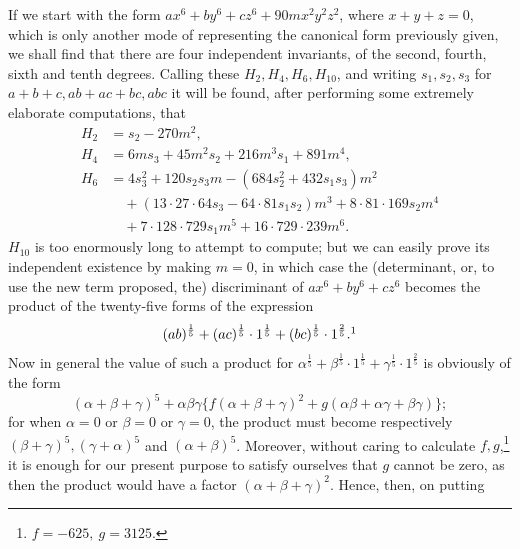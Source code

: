 \documentclass[11pt]{article}
\begin{document}
If we start with the form $ax^6+by^6+cz^6+90mx^2y^2z^2$, where $x+y+z=0$, which is only another mode of representing the canonical form previously given, we shall find that there are four independent invariants, of the second, fourth, sixth and tenth degrees. Calling these $H_2,H_4,H_6,H_{10}$, and writing $s_1,s_2,s_3$ for $a+b+c,ab+ac+bc,abc$ it will be found, after performing some extremely elaborate computations, that
\[
\begin{aligned}
H_2&=s_2-270m^2,\\
H_4&=6ms_3+45m^2s_2+216m^3s_1+891m^4,\\
H_6&=4s_3^2+120s_2s_3m-(684s_2^2+432s_1s_3)m^2\\
&\quad +(13\cdot27\cdot64s_3-64\cdot81s_1s_2)m^3+8\cdot81\cdot169s_2m^4\\
&\quad +7\cdot128\cdot729s_1m^5+16\cdot729\cdot239m^6.
\end{aligned}
\]
$H_{10}$ is too enormously long to attempt to compute; but we can easily prove its independent existence by making $m=0$, in which case the (determinant, or, to use the new term proposed, the) discriminant of $ax^6+by^6+cz^6$ becomes the product of the twenty-five forms of the expression
\[
(ab)^{\frac15}+(ac)^{\frac15}\cdot1^{\frac15}+(bc)^{\frac15}\cdot1^{\frac25}.\footnotemark
\]
Now in general the value of such a product for $\alpha^{\frac15}+\beta^{\frac15}\cdot1^{\frac15}+\gamma^{\frac15}\cdot1^{\frac25}$ is obviously of the form
\[
(\alpha+\beta+\gamma)^5+\alpha\beta\gamma\{f(\alpha+\beta+\gamma)^2+g(\alpha\beta+\alpha\gamma+\beta\gamma)\};
\]
for when $\alpha=0$ or $\beta=0$ or $\gamma=0$, the product must become respectively $(\beta+\gamma)^5,(\gamma+\alpha)^5$ and $(\alpha+\beta)^5$. Moreover, without caring to calculate $f,g$,\footnote{$f=-625,\ g=3125$.} it is enough for our present purpose to satisfy ourselves that $g$ cannot be zero, as then the product would have a factor $(\alpha+\beta+\gamma)^2$. Hence, then, on putting
\end{document}
